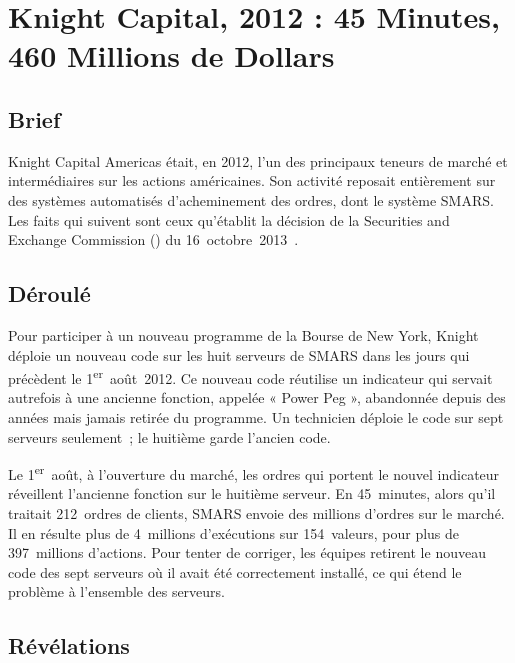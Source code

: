 \section{Knight Capital, 2012 : 45 Minutes, 460 Millions de Dollars}
\label{sec:c02-knight}

\subsection{Brief}

Knight Capital Americas était, en 2012, l'un des principaux teneurs de
marché et intermédiaires sur les actions américaines. Son activité
reposait entièrement sur des systèmes automatisés d'acheminement des
ordres, dont le système SMARS. Les faits qui suivent sont ceux qu'établit
la décision de la Securities and Exchange Commission () du
16~octobre~2013~\cite{sec2013knight}.

\subsection{Déroulé}

Pour participer à un nouveau programme de la Bourse de New York, Knight
déploie un nouveau code sur les huit serveurs de SMARS dans les jours qui
précèdent le 1\textsuperscript{er}~août~2012. Ce nouveau code réutilise un
indicateur qui servait autrefois à une ancienne fonction, appelée « Power
Peg », abandonnée depuis des années mais jamais retirée du programme. Un
technicien déploie le code sur sept serveurs seulement~; le huitième garde
l'ancien code.

Le 1\textsuperscript{er}~août, à l'ouverture du marché, les ordres qui
portent le nouvel indicateur réveillent l'ancienne fonction sur le
huitième serveur. En 45~minutes, alors qu'il traitait 212~ordres de
clients, SMARS envoie des millions d'ordres sur le marché. Il en résulte
plus de 4~millions d'exécutions sur 154~valeurs, pour plus de
397~millions d'actions. Pour tenter de corriger, les équipes retirent le
nouveau code des sept serveurs où il avait été correctement installé, ce
qui étend le problème à l'ensemble des serveurs.

\subsection{Révélations}

